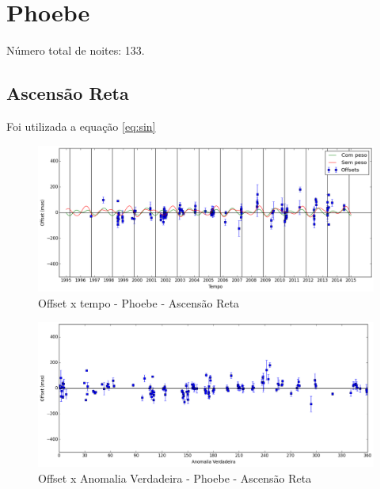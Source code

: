 \documentclass[11pt,a4paper]{report}
\begin{document}
\chapter*{Phoebe}

\indent \indent Número total de noites: 133.

\section*{Ascensão Reta}

Foi utilizada a equação \ref{eq:sin}

\begin{figure}[h]
\caption{Offset x tempo - Phoebe - Ascensão Reta}
\includegraphics[scale=0.45]{Phoebe/RA.png} 
\end{figure}

\begin{figure}[h]
\caption{Offset x Anomalia Verdadeira - Phoebe - Ascensão Reta}
\includegraphics[scale=0.45]{Phoebe/RA_anom.png}  
\end{figure}
\end{document}
